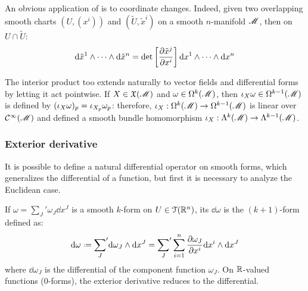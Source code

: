 An obvious application of  is to coordinate changes. Indeed, given two overlapping smooth charts $ (U,(x^i)) $ and $ (\tilde{U},\tilde{x}^i) $ on a smooth $ n $-manifold $ \mathscr{M} $, then on $ U \cap \tilde{U} $:
\begin{equation*}
  \mathrm{d} \tilde{x}^1 \wedge \dots \wedge \mathrm{d} \tilde{x}^n = \det \left[ \frac{\partial \tilde{x}^j}{\partial x^i} \right] \mathrm{d} x^1 \wedge \dots \wedge \mathrm{d} x^n
\end{equation*}

The interior product too extends naturally to vector fields and differential forms by letting it act pointwise. If $ X \in \mathfrak{X}(\mathscr{M}) $ and $ \omega \in \Omega^{k}(\mathscr{M}) $, then $ \iota_X \omega \in \Omega^{k-1}(\mathscr{M}) $ is defined by $ (\iota_X \omega)_p = \iota_{X_p} \omega_p $: therefore, $ \iota_X : \Omega^{k}(\mathscr{M}) \rightarrow \Omega^{k-1}(\mathscr{M}) $ is linear over $ \mathcal{C}^{\infty}(\mathscr{M}) $ and defined a smooth bundle homomorphism $ \iota_X : \Lambda^{k}(\mathscr{M}) \rightarrow \Lambda^{k-1}(\mathscr{M}) $.

\subsubsection{Exterior derivative}

It is possible to define a natural differential operator on smooth forms, which generalizes the differential of a function, but first it is necessary to analyze the Euclidean case.

If $ \omega = {\sum_J}' \omega_J \dd x^J $ is a smooth $ k $-form on $ U \in \EuScript{T}(\mathbb{R}^n) $, its  $ \dd \omega $ is the $ (k+1) $-form defined as:
\begin{equation}
  \dd \omega \defeq {\sum_J}' \dd \omega_J \wedge \dd x^J = {\sum_J}' \sum_{i = 1}^n \frac{\pa \omega_J}{\pa x^i} \dd x^i \wedge \dd x^J
\end{equation}
where $ \dd \omega_J $ is the differential of the component function $ \omega_J $. On $ \mathbb{R} $-valued functions ($ 0 $-forms), the exterior derivative reduces to the differential.

